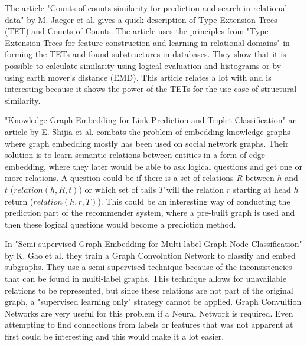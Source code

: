 The article "Counts-of-counts similarity for prediction and search in relational data" by M. Jaeger et al.\cite{jaeger2019counts} gives a quick description of Type Extension Trees (TET) and Counts-of-Counts. 
The article uses the principles from "Type Extension Trees for feature construction and learning in relational domains" in forming the TETs and found substructures in databases. 
They show that it is possible to calculate similarity using logical evaluation and histograms or by using earth mover's distance (EMD). 
This article relates a lot with \cite{JAEGER201330} and is interesting because it shows the power of the TETs for the use case of structural similarity.

"Knowledge Graph Embedding for Link Prediction and Triplet Classification" an article by E. Shijia et al. \cite{10.1007/978-981-10-3168-7_23} combats the problem of embedding knowledge graphs where graph embedding mostly has been used on social network graphs. 
Their solution is to learn semantic relations between entities in a form of edge embedding, where they later would be able to ask logical questions and get one or more relations. 
A question could be if there is a set of relations $R$ between $h$ and $t$ ($relation(h,R,t)$) or which set of tails $T$ will the relation $r$ starting at head $h$ return ($relation(h,r,T)$). 
This could be an interesting way of conducting the prediction part of the recommender system, where a pre-built graph is used and then these logical questions would become a prediction method.

In "Semi-supervised Graph Embedding for Multi-label Graph Node Classification" by K. Gao et al.\cite{10.1007/978-3-030-34223-4_35} they train a Graph Convolution Network to classify and embed subgraphs. 
They use a semi supervised technique because of the inconsistencies that can be found in multi-label graphs. 
This technique allows for unavailable relations to be represented, but since these relations are not part of the original graph, a "supervised learning only" strategy cannot be applied. 
Graph Convultion Networks are very useful for this problem if a Neural Network is required. 
Even attempting to find connections from labels or features that was not apparent at first could be interesting and this would make it a lot easier.